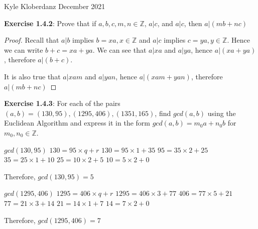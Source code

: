 \documentclass[a4paper]{article}
\begin{document}
\begin{myparindent}{0pt}

Kyle Kloberdanz  December 2021 \newline

\textbf{Exercise 1.4.2}:
Prove that if $a, b, c, m, n \in \mathbb{Z}$, $a|c$, and $a|c$, then
$a|(mb + nc)$
\begin{proof}
Recall that $a|b$ implies $b = xa, x \in \mathbb{Z}$
and $a|c$ implies $c = ya, y \in \mathbb{Z}$. Hence we can write
$b + c = xa + ya$. We can see that $a | xa$ and $a | ya$, hence $a | (xa + ya)$,
therefore $a | (b + c)$.
\newline

It is also true that $a | xam$ and $a | yan$, hence $a | (xam + yan)$,
therefore \newline
$a | (mb + nc)$
\end{proof}

\textbf{Exercise 1.4.3}:
For each of the pairs $(a, b) = (130, 95), (1295, 406), (1351, 165)$, find $gcd(a, b)$
using the Euclidean Algorithm and express it in the form $gcd(a, b) = m_0 a + n_0 b$
for $m_0, n_0 \in \mathbb{Z}$. \newline

$gcd(130, 95)$ \newline
$130 = 95 \times q + r$ \newline
$130 = 95 \times 1 + 35$ \newline
$95 = 35 \times 2 + 25$ \newline
$35 = 25 \times 1 + 10$ \newline
$25 = 10 \times 2 + 5$ \newline
$10 = 5 \times 2 + 0$ \newline

Therefore, $gcd(130, 95) = 5$ \newline

$gcd(1295, 406)$ \newline
$1295 = 406 \times q + r$ \newline
$1295 = 406 \times 3 + 77$ \newline
$406 = 77 \times 5 + 21$ \newline
$77 = 21 \times 3 + 14$ \newline
$21 = 14 \times 1 + 7$ \newline
$14 = 7 \times 2 + 0$ \newline

Therefore, $gcd(1295, 406) = 7$ \newline


\end{myparindent}
\end{document}
